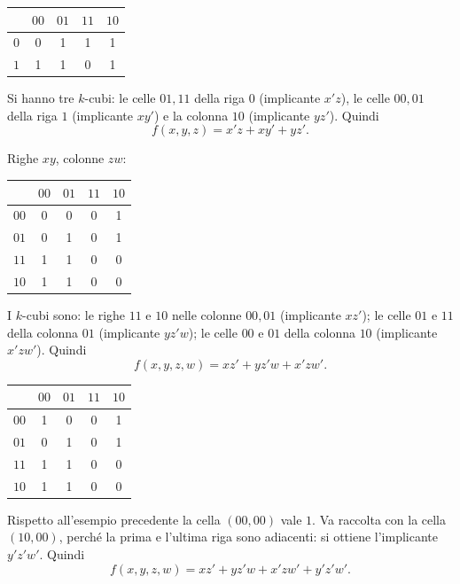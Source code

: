\documentclass[11pt,a4paper]{article}
\begin{document}
\begin{esempio}
\begin{center}
\begin{tabular}{c|cccc}
 & $00$ & $01$ & $11$ & $10$ \\
\midrule
$0$ & 0 & 1 & 1 & 1 \\
$1$ & 1 & 1 & 0 & 1 \\
\end{tabular}
\end{center}
Si hanno tre $k$-cubi: le celle $01,11$ della riga $0$ (implicante $x'z$), le celle $00,01$ della riga $1$ (implicante $xy'$) e la colonna $10$ (implicante $yz'$). Quindi
\[
f(x,y,z) = x'z + xy' + yz'.
\]
\end{esempio}

\begin{esempio}
Righe $xy$, colonne $zw$:
\begin{center}
\begin{tabular}{c|cccc}
 & $00$ & $01$ & $11$ & $10$ \\
\midrule
$00$ & 0 & 0 & 0 & 1 \\
$01$ & 0 & 1 & 0 & 1 \\
$11$ & 1 & 1 & 0 & 0 \\
$10$ & 1 & 1 & 0 & 0 \\
\end{tabular}
\end{center}
I $k$-cubi sono: le righe $11$ e $10$ nelle colonne $00,01$ (implicante $xz'$); le celle $01$ e $11$ della colonna $01$ (implicante $yz'w$); le celle $00$ e $01$ della colonna $10$ (implicante $x'zw'$). Quindi
\[
f(x,y,z,w) = xz' + yz'w + x'zw'.
\]
\end{esempio}

\begin{esempio}
\begin{center}
\begin{tabular}{c|cccc}
 & $00$ & $01$ & $11$ & $10$ \\
\midrule
$00$ & 1 & 0 & 0 & 1 \\
$01$ & 0 & 1 & 0 & 1 \\
$11$ & 1 & 1 & 0 & 0 \\
$10$ & 1 & 1 & 0 & 0 \\
\end{tabular}
\end{center}
Rispetto all'esempio precedente la cella $(00, 00)$ vale $1$. Va raccolta con la cella $(10, 00)$, perché la prima e l'ultima riga sono adiacenti: si ottiene l'implicante $y'z'w'$. Quindi
\[
f(x,y,z,w) = xz' + yz'w + x'zw' + y'z'w'.
\]
\end{esempio}
\end{document}
